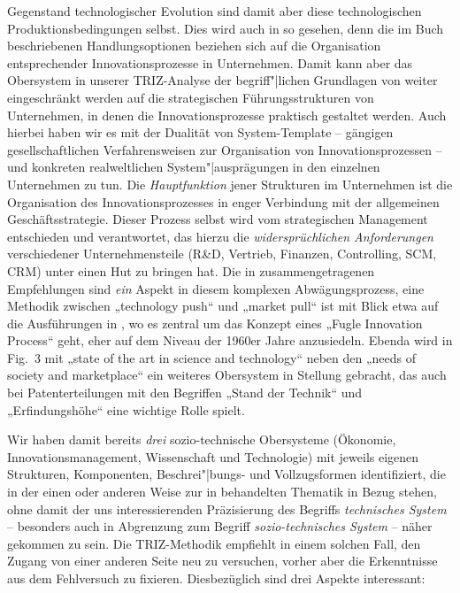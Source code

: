 \documentclass[11pt,a4paper]{article}
\begin{document}
Gegenstand technologischer Evolution sind damit aber diese technologischen
Produktionsbedingungen selbst. Dies wird auch in \cite{TESE2018} so gesehen,
denn die im Buch beschriebenen Handlungsoptionen beziehen sich auf die
Organisation entsprechender Innovationsprozesse in Unternehmen. Damit kann
aber das Obersystem in unserer TRIZ-Analyse der begriff"|lichen Grundlagen von
\cite{TESE2018} weiter eingeschränkt werden auf die strategischen
Führungsstrukturen von Unternehmen, in denen die Innovationsprozesse praktisch
gestaltet werden. Auch hierbei haben wir es mit der Dualität von
System-Template -- gängigen gesellschaftlichen Verfahrensweisen zur
Organisation von Innovationsprozessen -- und konkreten realweltlichen
System"|ausprägungen in den einzelnen Unternehmen zu tun. Die
\emph{Hauptfunktion} jener Strukturen im Unternehmen ist die Organisation des
Innovationsprozesses in enger Verbindung mit der allgemeinen
Geschäftsstrategie.  Dieser Prozess selbst wird vom strategischen Management
entschieden und verantwortet, das hierzu die \emph{widersprüchlichen
  Anforderungen} verschiedener Unternehmensteile (R\&D, Vertrieb, Finanzen,
Controlling, SCM, CRM) unter einen Hut zu bringen hat. Die in \cite{TESE2018}
zusammengetragenen Empfehlungen sind \emph{ein} Aspekt in diesem komplexen
Abwägungsprozess, eine Methodik zwischen „technology push“ und „market pull“
ist mit Blick etwa auf die Ausführungen in \cite{Preez2006}, wo es zentral um
das Konzept eines „Fugle Innovation Process“ geht, eher auf dem Niveau der
1960er Jahre anzusiedeln. Ebenda wird in Fig.~3 mit „state of the art in
science and technology“ neben den „needs of society and marketplace“ ein
weiteres Obersystem in Stellung gebracht, das auch  bei Patenterteilungen mit
den Begriffen „Stand der Technik“ und „Erfindungshöhe“ eine wichtige Rolle
spielt.

Wir haben damit bereits \emph{drei} sozio-technische Obersysteme (Ökonomie,
Innovationsmanagement, Wissenschaft und Technologie) mit jeweils eigenen
Strukturen, Komponenten, Beschrei"|bungs- und Vollzugsformen identifiziert, die
in der einen oder anderen Weise zur in \cite{TESE2018} behandelten Thematik in
Bezug stehen, ohne damit der uns interessierenden Präzisierung des Begriffs
\emph{technisches System} -- besonders auch in Abgrenzung zum Begriff
\emph{sozio-technisches System} -- näher gekommen zu sein. Die TRIZ-Methodik
empfiehlt in einem solchen Fall, den Zugang von einer anderen Seite neu zu
versuchen, vorher aber die Erkenntnisse aus dem Fehlversuch zu fixieren.
Diesbezüglich sind drei Aspekte interessant:
\end{document}
